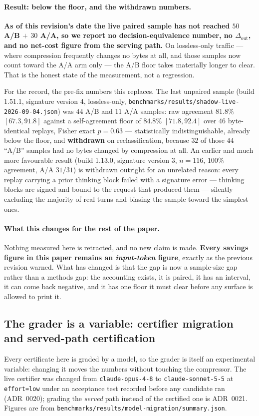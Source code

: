\documentclass[11pt]{article}
\begin{document}
\paragraph{Result: below the floor, and the withdrawn numbers.} \textbf{As of this revision's
date the live paired sample has not reached $50$ A/B $+$ $30$ A/A, so we report no
decision-equivalence number, no $\Delta_{\text{out}}$, and no net-cost figure from the serving
path.} On lossless-only traffic --- where compression frequently changes no bytes at all, and
those samples now count toward the A/A arm only --- the A/B floor takes materially longer to
clear. That is the honest state of the measurement, not a regression.

For the record, the pre-fix numbers this replaces. The last unpaired sample (build 1.51.1,
signature version $4$, lossless-only, \texttt{benchmarks/results/shadow-live-2026-09-04.json})
was $44$ A/B and $11$ A/A samples: raw agreement $81.8\%$ $[67.3, 91.8]$ against a
self-agreement floor of $84.8\%$ $[71.8, 92.4]$ over $46$ byte-identical replays, Fisher exact
$p=0.63$ --- statistically indistinguishable, already below the floor, and \textbf{withdrawn}
on reclassification, because $32$ of those $44$ ``A/B'' samples had no bytes changed by
compression at all. An earlier and much more favourable result (build 1.13.0, signature version
$3$, $n=116$, $100\%$ agreement, A/A $31/31$) is withdrawn outright for an unrelated reason:
every replay carrying a prior thinking block failed with a signature error --- thinking blocks
are signed and bound to the request that produced them --- silently excluding the majority of
real turns and biasing the sample toward the simplest ones.

\paragraph{What this changes for the rest of the paper.} Nothing measured here is retracted,
and no new claim is made. \textbf{Every savings figure in this paper remains an
\emph{input-token} figure}, exactly as the previous revision warned. What has changed is that
the gap is now a sample-size gap rather than a methods gap: the accounting exists, it is
paired, it has an interval, it can come back negative, and it has one floor it must clear
before any surface is allowed to print it.

\subsection{The grader is a variable: certifier migration and served-path certification}
Every certificate here is graded by a model, so the grader is itself an experimental variable:
changing it moves the numbers without touching the compressor. The live certifier was changed
from \texttt{claude-opus-4-8} to \texttt{claude-sonnet-5-5} at \texttt{effort=low} under an
acceptance test recorded before any candidate ran (ADR~0020); grading the \emph{served} path
instead of the certified one is ADR~0021. Figures are from
\texttt{benchmarks/results/model-migration/summary.json}.
\end{document}
